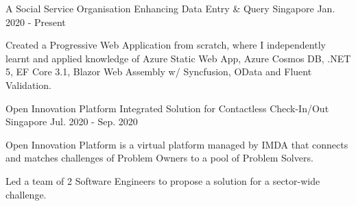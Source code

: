 

\begin{cventries}

  \cventry
    {A Social Service Organisation} %
    {Enhancing Data Entry \& Query} %
    {Singapore} %
    {Jan. 2020 - Present} %
    {
      \begin{cvitems} %
        \item {Created a Progressive Web Application from scratch, where I independently learnt and applied knowledge of Azure Static Web App, Azure Cosmos DB, .NET 5, EF Core 3.1, Blazor Web Assembly w/ Syncfusion, OData and Fluent Validation.}
      \end{cvitems}
    }

  \cventry
    {Open Innovation Platform} %
    {Integrated Solution for Contactless Check-In/Out} %
    {Singapore} %
    {Jul. 2020 - Sep. 2020} %
    {
      \begin{cvitems} %
        \item {Open Innovation Platform is a virtual platform managed by IMDA that connects and matches challenges of Problem Owners to a pool of Problem Solvers.}
        \item {Led a team of 2 Software Engineers to propose a solution for a sector-wide challenge.}
      \end{cvitems}
    }


\end{cventries}
